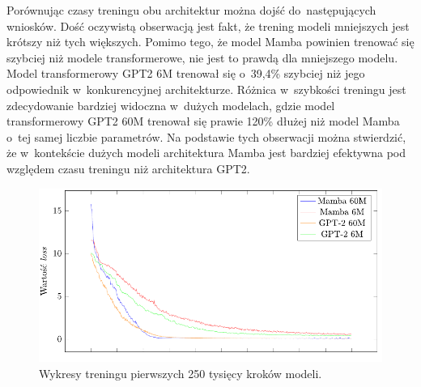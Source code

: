 \documentclass[data-science]{agh-wi} %
\begin{document}
Porównując czasy treningu obu architektur można dojść do~następujących wniosków. Dość oczywistą obserwacją jest fakt, że trening modeli mniejszych jest krótszy niż tych większych. Pomimo tego, że model Mamba powinien trenować się szybciej niż modele transformerowe, nie jest to prawdą dla mniejszego modelu. Model transformerowy GPT2 6M trenował się o~39,4\% szybciej niż jego odpowiednik w~konkurencyjnej architekturze. Różnica w~szybkości treningu jest zdecydowanie bardziej widoczna w~dużych modelach, gdzie model transformerowy GPT2 60M trenował się prawie 120\% dłużej niż model Mamba o~tej samej liczbie parametrów. Na podstawie tych obserwacji można stwierdzić, że w~kontekście dużych modeli architektura Mamba jest bardziej efektywna pod względem czasu treningu niż architektura GPT2.

\begin{figure}[ht!]
    \centering
    \includegraphics[width=0.9\linewidth]{./img/training_plot.pdf}
    \caption{Wykresy treningu pierwszych 250 tysięcy kroków modeli.}\label{fig:midi_train}
\end{figure}
\end{document}
